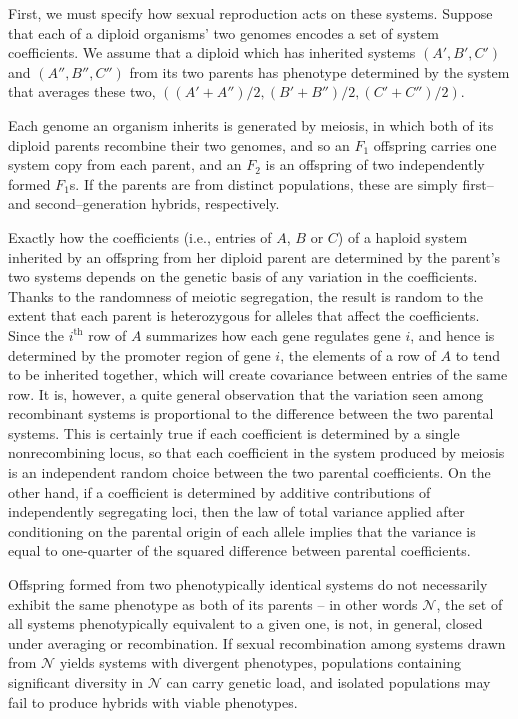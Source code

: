 \documentclass{article}
\newcommand{\1}{\mathbbm{1}}
\newcommand{\allS}{\mathcal{N}}
\begin{document}
First, we must specify how sexual reproduction acts on these systems.
Suppose that each of a diploid organisms' two genomes encodes a set of system coefficients.
We assume that a diploid which has inherited systems $(A', B', C')$ and $(A'', B'', C'')$ from its two parents
has phenotype determined by the system that averages these two,
$((A'+A'')/2, (B'+B'')/2, (C'+C'')/2)$.

Each genome an organism inherits is generated by meiosis,
in which both of its diploid parents recombine their two genomes,
and so an $F_1$ offspring carries one system copy from each parent,
and an $F_2$ is an offspring of two independently formed $F_1$s.
If the parents are from distinct populations,
these are simply first-- and second--generation hybrids, respectively.

Exactly how the coefficients 
(i.e., entries of $A$, $B$ or $C$)
of a haploid system inherited by an offspring from her diploid parent
are determined by the parent's two systems
depends on the genetic basis of any variation in the coefficients.
Thanks to the randomness of meiotic segregation,
the result is random to the extent that each parent is heterozygous
for alleles that affect the coefficients.
Since the $i^\text{th}$ row of $A$ summarizes how each gene regulates gene $i$,
and hence is determined by the promoter region of gene $i$,
the elements of a row of $A$ to tend to be inherited together,
which will create covariance between entries of the same row.
It is, however, a quite general observation that the variation seen among recombinant systems
is proportional to the difference between the two parental systems.
This is certainly true if each coefficient is determined by a single nonrecombining locus,
so that each coefficient in the system produced by meiosis is an independent random choice
between the two parental coefficients.
On the other hand, if a coefficient is determined by additive contributions of independently segregating loci,
then the law of total variance applied after conditioning on the parental origin of each allele
implies that the variance is equal to one-quarter of the squared difference between parental coefficients.

Offspring formed from two phenotypically identical systems do not necessarily exhibit the same phenotype as both of its parents -- in other words $\allS$, the set of all systems phenotypically equivalent to a given one, is not, in general, closed under averaging or recombination.
If sexual recombination among systems drawn from $\allS$ yields systems with divergent phenotypes, populations containing significant diversity in $\allS$ can carry genetic load, and isolated populations may fail to produce hybrids with viable phenotypes.
\end{document}
